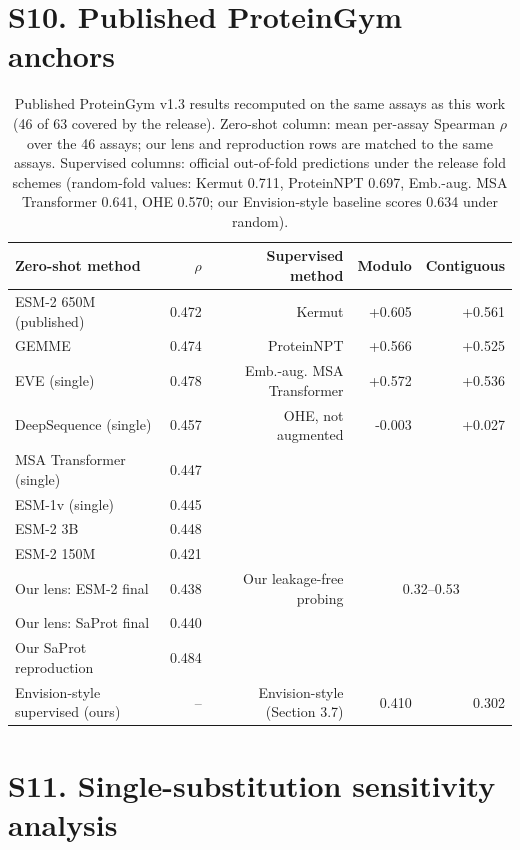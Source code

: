 \documentclass[11pt,a4paper]{article}
\begin{document}
\section*{S10. Published ProteinGym anchors}

\begin{table}[H]\centering\small
\caption{Published ProteinGym v1.3 results recomputed on the same assays as this work (46 of 63 covered by the release). Zero-shot column: mean per-assay Spearman $\rho$ over the 46 assays; our lens and reproduction rows are matched to the same assays. Supervised columns: official out-of-fold predictions under the release fold schemes (random-fold values: Kermut 0.711, ProteinNPT 0.697, Emb.-aug. MSA Transformer 0.641, OHE 0.570; our Envision-style baseline scores 0.634 under random).}
\label{tab:S10anchors}
\begin{tabular}{lrrrr}
\toprule
Zero-shot method & $\rho$ & Supervised method & Modulo & Contiguous \\
\midrule
ESM-2 650M (published) & 0.472 & Kermut & +0.605 & +0.561 \\
GEMME & 0.474 & ProteinNPT & +0.566 & +0.525 \\
EVE (single) & 0.478 & Emb.-aug. MSA Transformer & +0.572 & +0.536 \\
DeepSequence (single) & 0.457 & OHE, not augmented & -0.003 & +0.027 \\
MSA Transformer (single) & 0.447 & &  \\
ESM-1v (single) & 0.445 & &  \\
ESM-2 3B & 0.448 & &  \\
ESM-2 150M & 0.421 & &  \\
\midrule
Our lens: ESM-2 final & 0.438 & Our leakage-free probing & \multicolumn{2}{c}{0.32--0.53} \\
Our lens: SaProt final & 0.440 & & & \\
Our SaProt reproduction & 0.484 & & & \\
\midrule
Envision-style supervised (ours) & -- & Envision-style (Section 3.7) & 0.410 & 0.302 \\
\bottomrule
\end{tabular}
\end{table}

\section*{S11. Single-substitution sensitivity analysis}
\end{document}
